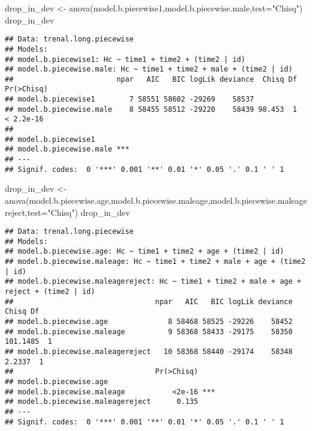 \documentclass[
]{article}
\newenvironment{Shaded}{\begin{snugshade}}{\end{snugshade}}
\newcommand{\AttributeTok}[1]{\textcolor[rgb]{0.77,0.63,0.00}{#1}}
\newcommand{\FunctionTok}[1]{\textcolor[rgb]{0.00,0.00,0.00}{#1}}
\newcommand{\NormalTok}[1]{#1}
\newcommand{\OtherTok}[1]{\textcolor[rgb]{0.56,0.35,0.01}{#1}}
\newcommand{\StringTok}[1]{\textcolor[rgb]{0.31,0.60,0.02}{#1}}
\begin{document}
\begin{Shaded}
\begin{Highlighting}[]
\NormalTok{drop\_in\_dev }\OtherTok{\textless{}{-}} \FunctionTok{anova}\NormalTok{(model.b.piecewise1,model.b.piecewise.male,}\AttributeTok{test=}\StringTok{"Chisq"}\NormalTok{)}
\NormalTok{drop\_in\_dev}
\end{Highlighting}
\end{Shaded}

\begin{verbatim}
## Data: trenal.long.piecewise
## Models:
## model.b.piecewise1: Hc ~ time1 + time2 + (time2 | id)
## model.b.piecewise.male: Hc ~ time1 + time2 + male + (time2 | id)
##                        npar   AIC   BIC logLik deviance  Chisq Df Pr(>Chisq)
## model.b.piecewise1        7 58551 58602 -29269    58537                     
## model.b.piecewise.male    8 58455 58512 -29220    58439 98.453  1  < 2.2e-16
##                           
## model.b.piecewise1        
## model.b.piecewise.male ***
## ---
## Signif. codes:  0 '***' 0.001 '**' 0.01 '*' 0.05 '.' 0.1 ' ' 1
\end{verbatim}

\begin{Shaded}
\begin{Highlighting}[]
\NormalTok{drop\_in\_dev }\OtherTok{\textless{}{-}} \FunctionTok{anova}\NormalTok{(model.b.piecewise.age,model.b.piecewise.maleage,model.b.piecewise.maleagereject,}\AttributeTok{test=}\StringTok{"Chisq"}\NormalTok{)}
\NormalTok{drop\_in\_dev}
\end{Highlighting}
\end{Shaded}

\begin{verbatim}
## Data: trenal.long.piecewise
## Models:
## model.b.piecewise.age: Hc ~ time1 + time2 + age + (time2 | id)
## model.b.piecewise.maleage: Hc ~ time1 + time2 + male + age + (time2 | id)
## model.b.piecewise.maleagereject: Hc ~ time1 + time2 + male + age + reject + (time2 | id)
##                                 npar   AIC   BIC logLik deviance    Chisq Df
## model.b.piecewise.age              8 58468 58525 -29226    58452            
## model.b.piecewise.maleage          9 58368 58433 -29175    58350 101.1485  1
## model.b.piecewise.maleagereject   10 58368 58440 -29174    58348   2.2337  1
##                                 Pr(>Chisq)    
## model.b.piecewise.age                         
## model.b.piecewise.maleage           <2e-16 ***
## model.b.piecewise.maleagereject      0.135    
## ---
## Signif. codes:  0 '***' 0.001 '**' 0.01 '*' 0.05 '.' 0.1 ' ' 1
\end{verbatim}
\end{document}
